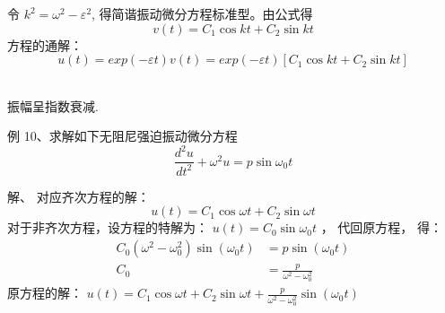 \begin{frame}	
	令 $k^2 =\omega ^2 - \varepsilon ^2 $, 得简谐振动微分方程标准型。由公式得
	\begin{equation*}
		v(t)=C_1 \cos k t +C_2 \sin k t 
	\end{equation*}
	方程的通解： 
	\begin{equation*}
		u(t)= exp(-\varepsilon t) v(t) =exp(-\varepsilon t) [ C_1 \cos k t +C_2 \sin k t] 
	\end{equation*}	
\end{frame}

\begin{frame}	
	\centering
	\\
	振幅呈指数衰减.
\end{frame}

\begin{frame}
	\begin{exampleblock} {例 10、求解如下无阻尼强迫振动微分方程}
	\begin{equation*}
		\frac{d^2 u}{d t^2} + \omega ^2 u = p  \sin \omega_0 t 
	\end{equation*}
	\end{exampleblock}
	\alert{解、} 
		对应齐次方程的解：\\
	\begin{equation*}
		u(t)=C_1 \cos \omega t +C_2 \sin \omega t 
	\end{equation*}
	对于非齐次方程，设方程的特解为：
	$ u(t) =C_0 \sin \omega_0 t $ ，
	代回原方程， 得：
	\begin{align*}
		C_0(\omega^2-\omega_{0} ^2 ) \sin(\omega_0 t)& =p\sin(\omega_0 t)\\
		C_0 & = \frac{p}{\omega^2-\omega_{0} ^2 }
	\end{align*}
	原方程的解： $ u(t)= C_1 \cos \omega t +C_2 \sin \omega t+ \frac{p}{\omega^2-\omega_{0} ^2 } \sin (\omega_0 t) $ \\
\end{frame}

